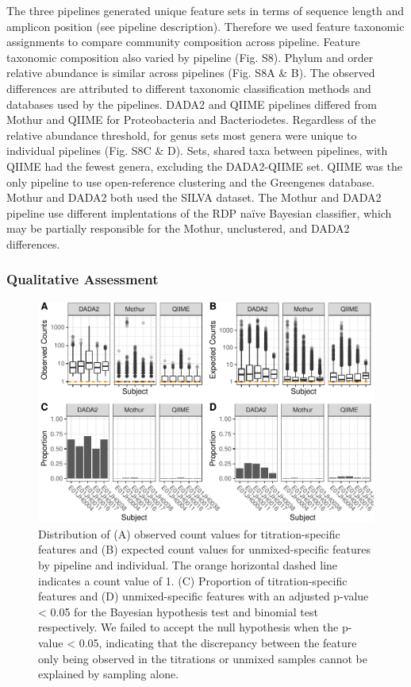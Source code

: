 \documentclass{bmcart}
\begin{document}
The three pipelines generated unique feature sets in terms of sequence
length and amplicon position (see pipeline description). Therefore we
used feature taxonomic assignments to compare community composition across pipeline.
Feature taxonomic composition also varied by pipeline (Fig. S8). Phylum and order relative abundance is similar
across pipelines (Fig. S8A \& B). The observed
differences are attributed to different taxonomic classification methods
and databases used by the pipelines. DADA2 and QIIME pipelines differed
from Mothur and QIIME for Proteobacteria and Bacteriodetes. Regardless
of the relative abundance threshold, for genus sets most genera were
unique to individual pipelines (Fig. S8C \& D). Sets,
shared taxa between pipelines, with QIIME had the fewest genera,
excluding the DADA2-QIIME set. QIIME was the only pipeline to use
open-reference clustering and the Greengenes database. Mothur and DADA2
both used the SILVA dataset. The Mothur and DADA2 pipeline use different
implentations of the RDP naïve Bayesian classifier, which may be
partially responsible for the Mothur, unclustered, and DADA2
differences.

\subsubsection*{Qualitative Assessment}

\begin{figure}
\centering
\includegraphics{qualPlot-1.pdf}
\caption{\label{fig:qualPlot}Distribution of (A) observed count values for
titration-specific features and (B) expected count values for
unmixed-specific features by pipeline and individual. The orange
horizontal dashed line indicates a count value of 1. (C) Proportion of
titration-specific features and (D) unmixed-specific features with an
adjusted p-value \textless{} 0.05 for the Bayesian hypothesis test and
binomial test respectively. We failed to accept the null hypothesis when
the p-value \textless{} 0.05, indicating that the discrepancy between
the feature only being observed in the titrations or unmixed samples
cannot be explained by sampling alone.}
\end{figure}
\end{document}
